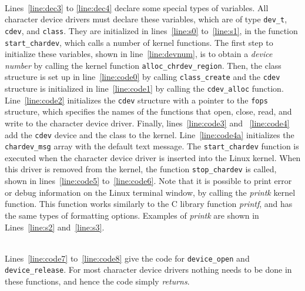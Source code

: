 \documentclass[epsfig,10pt,fullpage]{article}
\begin{document}
~\\
\noindent
Lines~\ref{line:dec3} to \ref{line:dec4} declare some special types of variables. 
All character device drivers must declare these variables, which are of type \texttt{dev\_t},
\texttt{cdev}, and \texttt{class}. They are initialized in lines~\ref{line:s0} 
to~\ref{line:s1}, in the function 
\texttt{start\_chardev}, which calls a number of kernel functions. The first step to initialize
these variables, shown in line~\ref{line:devnum}, is to obtain a {\it device number} by calling
the kernel function \texttt{alloc\_chrdev\_region}. Then, the class structure is set up in
line~\ref{line:code0} by calling \texttt{class\_create} and the \texttt{cdev} structure 
is initialized in line~\ref{line:code1} by calling
the \texttt{cdev\_alloc} function. Line~\ref{line:code2} initializes the \texttt{cdev}
structure with a pointer to the \texttt{fops} structure, which specifies the names of the
functions that open, close, read, and write to the character device driver. 
Finally, lines~\ref{line:code3} and ~\ref{line:code4} add the \texttt{cdev} device and the
class to the kernel. Line~\ref{line:code4a} initializes the \texttt{chardev\_msg} array with
the default text message. The \texttt{start\_chardev} function is executed when the character
device driver is inserted into the Linux kernel. When this driver is removed from the
kernel, the function \texttt{stop\_chardev} is called, shown in lines~\ref{line:code5}
to~\ref{line:code6}. Note that it is possible to print error or debug information on the 
Linux terminal window, by calling the {\it printk} kernel function. This function
works similarly to the C library function {\it printf}, and has the same types of formatting 
options. Examples of {\it printk} are shown in Lines~\ref{line:s2} and~\ref{line:s3}.

~\\
\noindent
Lines~\ref{line:code7} to~\ref{line:code8} give the code for \texttt{device\_open} and
\texttt{device\_release}. For most character device drivers nothing needs to be done in these
functions, and hence the code simply {\it returns}.
\end{document}
